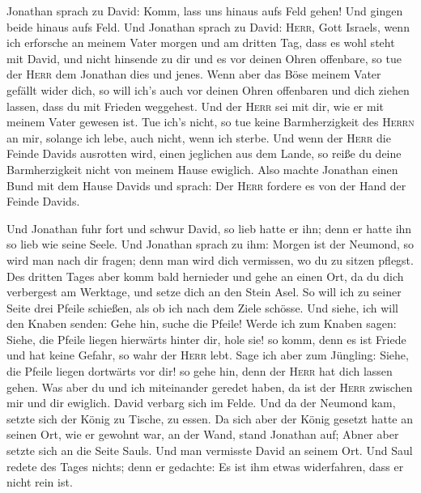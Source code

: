  Jonathan sprach zu David: Komm, lass uns hinaus aufs
Feld gehen! Und gingen beide hinaus aufs Feld.  Und
Jonathan sprach zu David: \textsc{Herr}, Gott Israels, wenn ich
erforsche an meinem Vater morgen und am dritten Tag, dass es wohl steht
mit David, und nicht hinsende zu dir und es vor deinen Ohren offenbare,
 so tue der \textsc{Herr} dem Jonathan dies und jenes.
Wenn aber das Böse meinem Vater gefällt wider dich, so will ich's auch
vor deinen Ohren offenbaren und dich ziehen lassen, dass du mit Frieden
weggehest. Und der \textsc{Herr} sei mit dir, wie er mit meinem Vater
gewesen ist.  Tue ich's nicht, so tue keine
Barmherzigkeit des \textsc{Herrn} an mir, solange ich lebe, auch nicht,
wenn ich sterbe.  Und wenn der \textsc{Herr} die Feinde
Davids ausrotten wird, einen jeglichen aus dem Lande, so reiße du deine
Barmherzigkeit nicht von meinem Hause ewiglich.  Also
machte Jonathan einen Bund mit dem Hause Davids und sprach: Der
\textsc{Herr} fordere es von der Hand der Feinde Davids.

 Und Jonathan fuhr fort und schwur David, so lieb hatte
er ihn; denn er hatte ihn so lieb wie seine Seele.  Und
Jonathan sprach zu ihm: Morgen ist der Neumond, so wird man nach dir
fragen; denn man wird dich vermissen, wo du zu sitzen pflegst.
 Des dritten Tages aber komm bald hernieder und gehe an
einen Ort, da du dich verbergest am Werktage, und setze dich an den
Stein Asel.  So will ich zu seiner Seite drei Pfeile
schießen, als ob ich nach dem Ziele schösse.  Und siehe,
ich will den Knaben senden: Gehe hin, suche die Pfeile! Werde ich zum
Knaben sagen: Siehe, die Pfeile liegen hierwärts hinter dir, hole sie!
so komm, denn es ist Friede und hat keine Gefahr, so wahr der
\textsc{Herr} lebt.  Sage ich aber zum Jüngling: Siehe,
die Pfeile liegen dortwärts vor dir! so gehe hin, denn der \textsc{Herr}
hat dich lassen gehen.  Was aber du und ich miteinander
geredet haben, da ist der \textsc{Herr} zwischen mir und dir ewiglich.
 David verbarg sich im Felde. Und da der Neumond kam,
setzte sich der König zu Tische, zu essen.  Da sich aber
der König gesetzt hatte an seinen Ort, wie er gewohnt war, an der Wand,
stand Jonathan auf; Abner aber setzte sich an die Seite Sauls. Und man
vermisste David an seinem Ort.  Und Saul redete des Tages
nichts; denn er gedachte: Es ist ihm etwas widerfahren, dass er nicht
rein ist.

